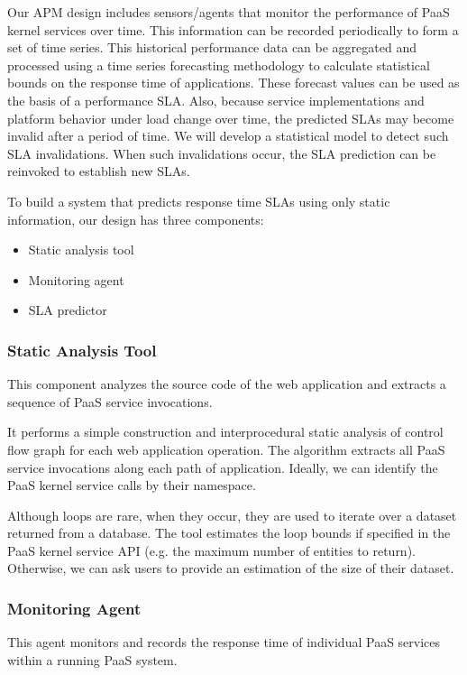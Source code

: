 \documentclass[11pt]{article}
\begin{document}
Our APM design includes sensors/agents that monitor the performance of PaaS kernel services over time. This
information can be recorded periodically to form a set of time series. This historical performance data can be
aggregated and processed using a time series forecasting methodology to calculate statistical bounds on the
response time of applications. These forecast values can be used as the basis of
a performance SLA.
Also, because service implementations and platform behavior under load change over time,
the predicted SLAs may become invalid after a period of time. We will develop a statistical model to detect such SLA invalidations.
When such invalidations occur, the SLA prediction can be reinvoked to establish new SLAs.

To build a system that predicts response time SLAs using only static information, our design has three components:
\begin{itemize}
\item Static analysis tool
\item Monitoring agent
\item SLA predictor
\end{itemize}

\subsubsection{Static Analysis Tool}
This component analyzes the source code of the web application and extracts a sequence of PaaS service invocations.

It performs a simple construction and interprocedural static analysis of control flow graph for each web application operation.
The algorithm extracts all PaaS service invocations along each path of application. 
Ideally, we can identify the PaaS kernel service calls
by their namespace.

Although loops are rare, when they occur, they are used to iterate over a dataset returned from a database. The tool estimates the loop 
bounds if specified in the PaaS kernel service API (e.g. the maximum number of entities to return). Otherwise, we can ask users to provide
an estimation of the size of their dataset.

\subsubsection{Monitoring Agent}
This agent monitors and records the response time of individual PaaS services within a running PaaS system.
\end{document}

